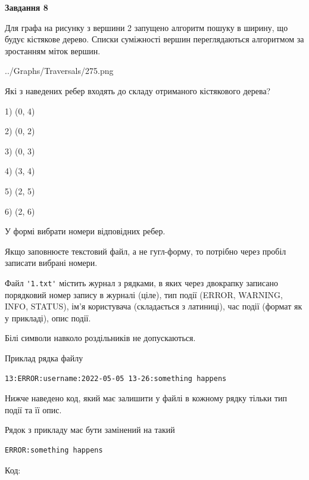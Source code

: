 \documentclass[12pt, ukrainian]{article}
\def\code#1{\Verb!#1!}
\begin{document}
{\begin {large}
{\begin {center}\textbf{Завдання 8}\end {center}}\par
Для графа на рисунку з вершини 2 запущено алгоритм пошуку в ширину, що будує кістякове дерево. Списки суміжності вершин переглядаються алгоритмом за зростанням міток вершин.\par
\begin{center}
	{../Graphs/Traversals/275.png}
\end{center}
\par Які з наведених ребер входять до складу отриманого кістякового дерева?\par
1) (0, 4)\par
2) (0, 2)\par
3) (0, 3)\par
4) (3, 4)\par
5) (2, 5)\par
6) (2, 6)\par
{\vskip 15pt} У формі вибрати номери відповідних ребер.


Якщо заповнюєте текстовий файл, а не гугл-форму, то потрібно через пробіл записа\-ти вибрані номери.\par
\newpage


Файл \code{'1.txt'} містить журнал з рядками, в яких через двокрапку записано поряд\-ко\-вий номер запису в журналі (ціле), тип події (ERROR, WARNING, INFO, STATUS), ім'я користувача (складається з латиниці), час події (фор\-мат як у прикладі), опис події.

Білі символи навколо роздільників не допускаються.

Приклад рядка файлу



\begin{verbatim}
13:ERROR:username:2022-05-05 13-26:something happens
\end{verbatim}


Нижче наведено код, який має залишити у файлі в кожному рядку тільки тип події та її опис.

Рядок з прикладу має бути замінений на такий



\begin{verbatim}
ERROR:something happens
\end{verbatim}




Код:




\end{large}}
\end{document}
